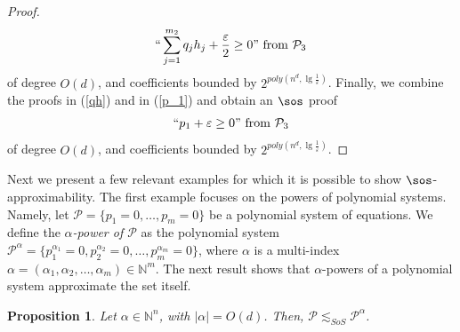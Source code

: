 \documentclass[11pt]{article}
\newtheorem{proposition}[theorem]{Proposition}
\begin{document}
\begin{proof}
    \begin{align}\label{qh}
        ``\sum_{j=1}^{m_2}q_jh_j +\frac{\varepsilon}{2} \geq 0" \text{ from }\mathcal{P}_3
    \end{align}
   of degree $O(d)$, and coefficients bounded by $2^{poly(n^d, \lg \frac{1}{\varepsilon})}$. Finally, we combine the proofs in (\ref{qh}) and in (\ref{p_1}) and obtain an $\sos$ proof
    \begin{align}\label{p_1-final}
        ``p_1 + \varepsilon \geq 0" \text{ from }\mathcal{P}_3
    \end{align}
    of degree $O(d)$, and coefficients bounded by $2^{poly(n^d, \lg \frac{1}{\varepsilon})}$.  
\end{proof}

Next we present a few relevant examples for which it is possible to show $\sos$-approximability. The first example focuses on the powers of polynomial systems. Namely, let $\mathcal{P} = \{p_1 = 0, \ldots, p_m = 0\}$ be a polynomial system of equations. We define the \emph{$\alpha$-power of $\mathcal{P}$} as the polynomial system $\mathcal{P}^{\alpha} = \{p_1^{\alpha_1} = 0, p_2^{\alpha_2} = 0, \ldots, p_m^{\alpha_m} =0\}$, where $\alpha$ is a multi-index $\alpha = (\alpha_1,\alpha_2, \ldots, \alpha_m) \in \mathbb{N}^m$. The next result shows that $\alpha$-powers of a polynomial system approximate the set itself.

\begin{proposition}\label{prop:alpha_powers}
    Let $\alpha\in \mathbb{N}^n$, with $|\alpha|=O(d)$. Then, $\mathcal P\lesssim_{SoS}\mathcal{P}^\alpha$.
\end{proposition}
\end{document}
